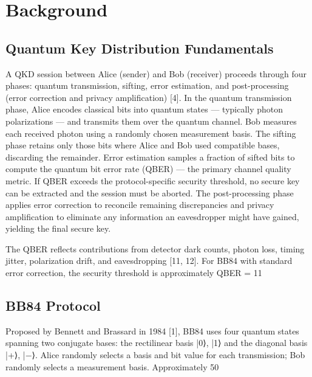 \section{Background}
\subsection{Quantum Key Distribution Fundamentals}
A QKD session between Alice (sender) and Bob (receiver) proceeds through four phases: quantum transmission, sifting, error estimation, and post-processing (error correction and privacy amplification) [4]. In the quantum transmission phase, Alice encodes classical bits into quantum states — typically photon polarizations — and transmits them over the quantum channel. Bob measures each received photon using a randomly chosen measurement basis. The sifting phase retains only those bits where Alice and Bob used compatible bases, discarding the remainder. Error estimation samples a fraction of sifted bits to compute the quantum bit error rate (QBER) — the primary channel quality metric. If QBER exceeds the protocol-specific security threshold, no secure key can be extracted and the session must be aborted. The post-processing phase applies error correction to reconcile remaining discrepancies and privacy amplification to eliminate any information an eavesdropper might have gained, yielding the final secure key.

The QBER reflects contributions from detector dark counts, photon loss, timing jitter, polarization drift, and eavesdropping [11, 12]. For BB84 with standard error correction, the security threshold is approximately QBER = 11%

\subsection{BB84 Protocol}
Proposed by Bennett and Brassard in 1984 [1], BB84 uses four quantum states spanning two conjugate bases: the rectilinear basis {|0⟩, |1⟩} and the diagonal basis {|+⟩, |−⟩}. Alice randomly selects a basis and bit value for each transmission; Bob randomly selects a measurement basis. Approximately 50%


